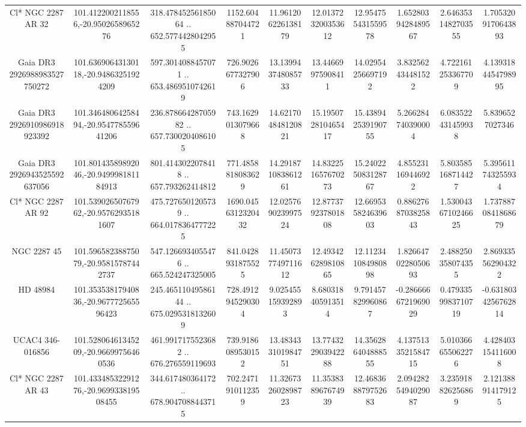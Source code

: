 \begin{table}
\begin{tabular}{cccccccccc}
Cl* NGC 2287     AR      32 & 101.4122002118556,-20.9502658965276 & 318.47845256185064 .. 652.5774428042955 & 1152.604887044721 & 11.961206226138179 & 12.013723200353612 & 12.954755431559578 & 1.6528039428489567 & 2.6463531482703555 & 1.7053209170643893 \\
Gaia DR3 2926988983527750272 & 101.63690643130118,-20.94863251924209 & 597.3014088457071 .. 653.4869510742619 & 726.9026677327906 & 13.139943748085733 & 13.44669975908411 & 14.02954256697192 & 3.832562434481522 & 4.722161253367709 & 4.1393184454798995 \\
Gaia DR3 2926910986918923392 & 101.34648064258494,-20.954778559641206 & 236.87866428705982 .. 657.7300204086105 & 743.1629013079668 & 14.621704848120821 & 15.195072810465417 & 15.438942539190755 & 5.266284740390004 & 6.083522431459938 & 5.8396527027346 \\
Gaia DR3 2926943525592637056 & 101.80143589892046,-20.949998181184913 & 801.4143022078418 .. 657.793262414812 & 771.4858818083629 & 14.291871083861261 & 14.832251657670273 & 15.240225083128767 & 4.855231169446922 & 5.803585168714427 & 5.395611743255934 \\
Cl* NGC 2287     AR      92 & 101.53902650767962,-20.95762935181607 & 475.7276501205739 .. 664.0178364777225 & 1690.0456312320432 & 12.025769023997524 & 12.877379237801808 & 12.669535824639603 & 0.8862768703825843 & 1.5300436710246625 & 1.7378870841868679 \\
NGC  2287    45 & 101.59658238875079,-20.95815787442737 & 547.1266934055476 .. 665.524247325005 & 841.0428931875525 & 11.450737749711612 & 12.493426289810865 & 12.112341084980898 & 1.8266470228050693 & 2.488250358074355 & 2.869335562904322 \\
HD  48984 & 101.35353817940836,-20.967772565596423 & 245.46511049586144 .. 675.0295318132609 & 728.4912945290304 & 9.025455159392893 & 8.680318405913514 & 9.791457829960867 & -0.2866666721969029 & 0.4793359983710719 & -0.6318034256762814 \\
UCAC4 346-016856 & 101.52806461345209,-20.96699756460536 & 461.9917175523682 .. 676.276559119693 & 739.9186089530152 & 13.483433101984751 & 13.774322903942288 & 14.356286404888555 & 4.1375133521584715 & 5.010366655062276 & 4.428403154116008 \\
Cl* NGC 2287     AR      43 & 101.43348532291276,-20.969933819508455 & 344.617480364172 .. 678.9047088443715 & 702.2471910112359 & 11.326732602898723 & 11.353838967674939 & 12.468368879752683 & 2.0942825494029087 & 3.235918826256869 & 2.121388914179125 \\

\end{tabular}
\end{table}
